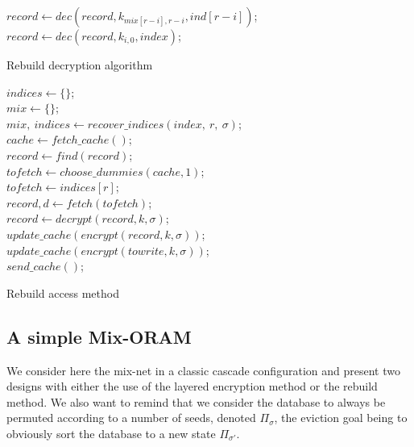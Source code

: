 \documentclass[USenglish,oneside,twocolumn]{article}
\begin{document}
\begin{algorithm}
\DontPrintSemicolon
{}
{
$record \gets dec(record, k_{mix[r-i],r-i}, ind[r-i] )$;\\
}
{
$record \gets dec(record, k_{i,0}, index )$;\\
}
\caption{Rebuild decryption algorithm}
\label{alg:rdec}
\end{algorithm}

\begin{algorithm}
\DontPrintSemicolon
{}
$indices \gets \{\}$;\\
$mix\gets \{\}$;\\
{
$mix,\ indices \gets recover\_indices(index,\ r,\ \sigma)$;\\
}
$cache \gets fetch\_cache()$;\\
{
$record \gets find(record)$;\\
$tofetch \gets choose\_dummies(cache, 1)$;\\
}
\Else
{
$tofetch \gets indices[r]$;\\
}
$record, d \gets fetch(tofetch)$;\\
$record \gets decrypt(record,k,\sigma)$;\\
{
$update\_cache(encrypt(record,k,\sigma))$;\\
}
\Else
{
$update\_cache(encrypt(towrite,k,\sigma))$;\\
}
$send\_cache()$;\\
\caption{Rebuild access method}
\label{alg:racc}
\end{algorithm}

%
\subsection{A simple Mix-ORAM}\label{SMO}
%
We consider here the mix-net in a classic cascade configuration and present two designs with either the use of the layered encryption method or the rebuild method. We also want to remind that we consider the database to always be permuted according to a number of seeds, denoted $\Pi_{\sigma}$, the eviction goal being to obviously sort the database to a new state $\Pi_{\sigma'}$.
\end{document}

